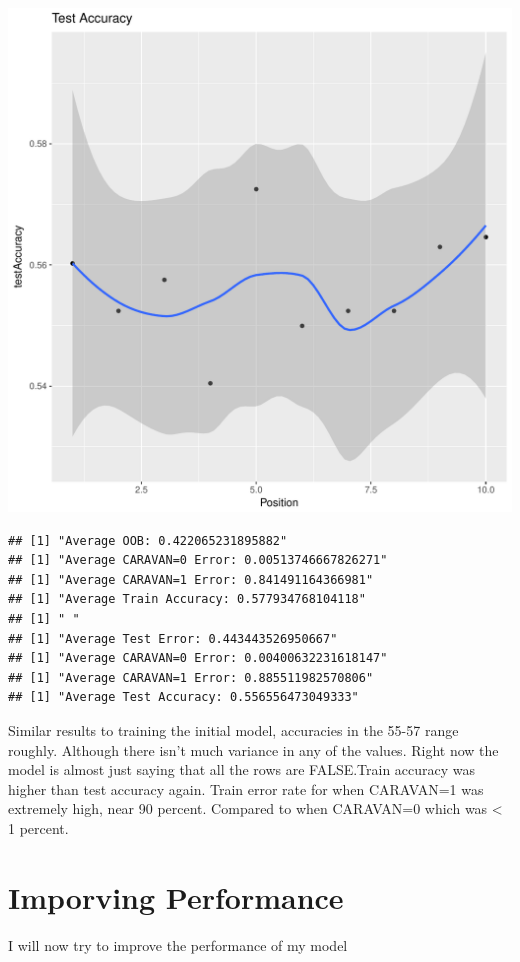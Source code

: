 \documentclass{article}\usepackage[]{graphicx}\usepackage[]{color}
\makeatletter
\def\maxwidth{ %
  \ifdim\Gin@nat@width>\linewidth
    \linewidth
  \else
    \Gin@nat@width
  \fi
}
\newenvironment{kframe}{%
 \def\at@end@of@kframe{}%
 \ifinner\ifhmode%
  \def\at@end@of@kframe{\end{minipage}}%
  \begin{minipage}{\columnwidth}%
 \fi\fi%
 \def\FrameCommand##1{\hskip\@totalleftmargin \hskip-\fboxsep
 \colorbox{shadecolor}{##1}\hskip-\fboxsep
     \hskip-\linewidth \hskip-\@totalleftmargin \hskip\columnwidth}%
 \MakeFramed {\advance\hsize-\width
   \@totalleftmargin\z@ \linewidth\hsize
   \@setminipage}}%
 {\par\unskip\endMakeFramed%
 \at@end@of@kframe}
\newenvironment{knitrout}{}{} %
\makeatother
\begin{document}
\begin{knitrout}
\begin{kframe}
{\ttfamily\noindent\itshape\color{messagecolor}{\#\# `geom\_smooth()` using method = 'loess'}}\end{kframe}
\includegraphics[width=\maxwidth]{figure/unnamed-chunk-31-8} 
\begin{kframe}\begin{verbatim}
## [1] "Average OOB: 0.422065231895882"
## [1] "Average CARAVAN=0 Error: 0.00513746667826271"
## [1] "Average CARAVAN=1 Error: 0.841491164366981"
## [1] "Average Train Accuracy: 0.577934768104118"
## [1] " "
## [1] "Average Test Error: 0.443443526950667"
## [1] "Average CARAVAN=0 Error: 0.00400632231618147"
## [1] "Average CARAVAN=1 Error: 0.885511982570806"
## [1] "Average Test Accuracy: 0.556556473049333"
\end{verbatim}
\end{kframe}
\end{knitrout}
Similar results to training the initial model, accuracies in the 55-57 range roughly. Although there isn't much variance in any of the values. Right now the model is almost just saying that all the rows are FALSE.Train accuracy was higher than test accuracy again. Train error rate for when CARAVAN=1 was extremely high, near 90 percent. Compared to when CARAVAN=0 which was < 1 percent. 
\section{Imporving Performance}
I will now try to improve the performance of my model 
\end{document}
